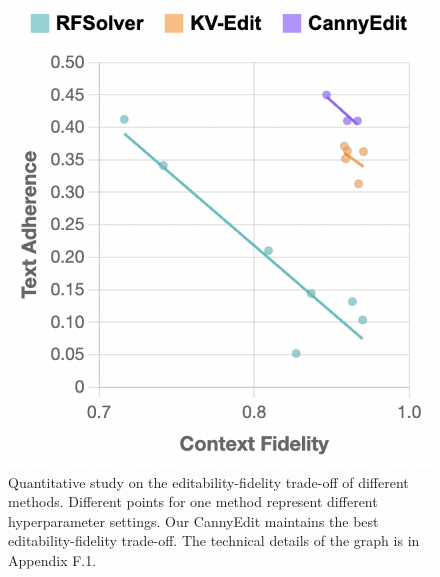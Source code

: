 \documentclass{article}
\begin{document}
\begin{figure}
  \vspace{-12pt} %
    \includegraphics[width=1\linewidth]{figures/tl4.png}
    \vspace{-6mm}
    \caption{\small {Quantitative study on the editability-fidelity trade-off of different methods.} Different points for one method represent different hyperparameter settings. Our CannyEdit maintains the best editability-fidelity trade-off. The technical details of the graph is in Appendix F.1.}
    \label{treadline}
      \vspace{-9pt} %
\end{figure}
\end{document}
